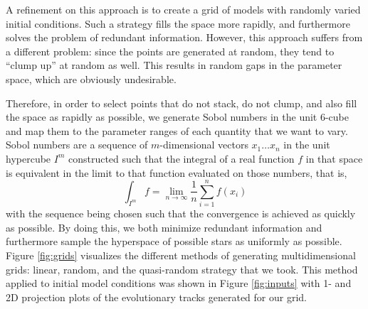 \documentclass[iop,apj,twocolappendix]{emulateapj}
\begin{document}
A refinement on this approach is to create a grid of models with randomly varied initial conditions. Such a strategy fills the space more rapidly, and furthermore solves the problem of redundant information. However, this approach suffers from a different problem: since the points are generated at random, they tend to ``clump up'' at random as well. This results in random gaps in the parameter space, which are obviously undesirable. 

Therefore, in order to select points that do not stack, do not clump, and also fill the space as rapidly as possible, we generate Sobol numbers \citep{sobol1967distribution} in the unit 6-cube and map them to the parameter ranges of each quantity that we want to vary. Sobol numbers are a sequence of $m$-dimensional vectors $x_1 \ldots x_n$ in the unit hypercube $I^m$ constructed such that the integral of a real function $f$ in that space is equivalent in the limit to that function evaluated on those numbers, that is,
\begin{equation}
    \int_{I^m} f = \lim_{n \to \infty} \frac{1}{n}\sum_{i=1}^n f(x_i)
\end{equation}
with the sequence being chosen such that the convergence is achieved as quickly as possible. By doing this, we both minimize redundant information and furthermore sample the hyperspace of possible stars as uniformly as possible. Figure \ref{fig:grids} visualizes the different methods of generating multidimensional grids: linear, random, and the quasi-random strategy that we took. This method applied to initial model conditions was shown in Figure \ref{fig:inputs} with 1- and 2D projection plots of the evolutionary tracks generated for our grid. 

\begin{figure*}
    \centering
    \caption{Results of different methods for generating multidimensional grids portrayed via a unit cube projected onto a unit square. Linear (left), random (middle), and quasi-random (right) grids are generated in three dimensions, with color depicting the third dimension, i.e., the distance between the reader and the screen. From top to bottom, all three methods are shown with 100, 400, and 2000 points generated, respectively. }%
    \label{fig:grids}
\end{figure*}
\end{document}
